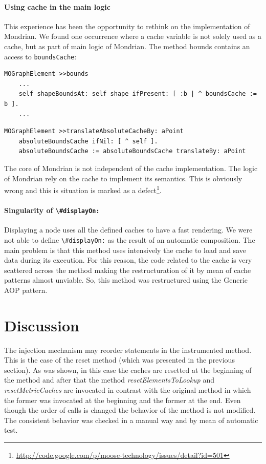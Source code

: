 \documentclass[preprint,10pt]{sigplanconf}
\newcommand{\ct}{\lstinline[backgroundcolor=\color{white},basicstyle=\footnotesize\ttfamily]}
\newcommand{\seclabel}[1]{\label{sec:#1}}
\begin{document}
\paragraph{Using cache in the main logic}
This experience has been the opportunity to rethink on the implementation of Mondrian. We found one occurrence where a cache variable is not solely used as a cache, but as part of main logic of Mondrian. The method bounds contains an access to \ct{boundsCache}: 

\begin{lstlisting} 
MOGraphElement >>bounds
	...
	self shapeBoundsAt: self shape ifPresent: [ :b | ^ boundsCache := b ].
	...
\end{lstlisting}

\begin{lstlisting} 
MOGraphElement >>translateAbsoluteCacheBy: aPoint
	absoluteBoundsCache ifNil: [ ^ self ].
	absoluteBoundsCache := absoluteBoundsCache translateBy: aPoint
\end{lstlisting}

The core of Mondrian is not independent of the cache implementation. The logic of Mondrian rely on the cache to implement its semantics. This is obviously wrong and this is situation is marked as a defect\footnote{\url{http://code.google.com/p/moose-technology/issues/detail?id=501}}.

\paragraph{Singularity of \ct{\#displayOn:}} Displaying a node uses all the defined caches to have a fast rendering. We were not able to define \ct{\#displayOn:} as the result of an automatic composition. The main problem is that this method uses intensively the cache to load and save data during its execution. For this reason, the code related to the cache is very scattered across the method  making the restructuration of it by mean of cache patterns almost unviable. So, this method was restructured using the Generic AOP pattern. 

\section{Discussion}\seclabel{discussion}

The injection mechanism may reorder statements in the instrumented method. This is the case of the reset method (which was presented in the previous section). As was shown, in this case the caches are resetted at the beginning of the method and after that the method \emph{resetElementsToLookup} and \emph{resetMetricCaches} are invocated in contrast with the original method in which the former was invocated at the beginning and the former at the end. Even though the order of calls is changed the behavior of the method is not modified. The consistent behavior was checked in a manual way and by mean of automatic test.
\end{document}
